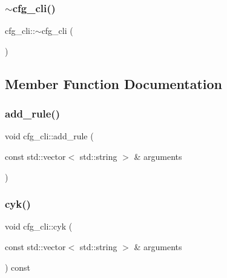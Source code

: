 \mbox{\label{classcfg__cli_ae6d900444e2cb5b820eea4db1a0c3723}} 
\subsubsection{\texorpdfstring{$\sim$cfg\_cli()}{~cfg\_cli()}}
{\footnotesize\ttfamily cfg\+\_\+cli\+::$\sim$cfg\+\_\+cli (\begin{DoxyParamCaption}{ }\end{DoxyParamCaption})}



\subsection{Member Function Documentation}
\mbox{\label{classcfg__cli_a9b6c74a0ff4a8d1d8c5b8b7c898da5b8}} 
\subsubsection{\texorpdfstring{add\_rule()}{add\_rule()}}
{\footnotesize\ttfamily void cfg\+\_\+cli\+::add\+\_\+rule (\begin{DoxyParamCaption}\item[{const std\+::vector$<$ std\+::string $>$ \&}]{arguments }\end{DoxyParamCaption})}

\mbox{\label{classcfg__cli_a67a7343e67e89eec5851c0b6a3224b36}} 
\subsubsection{\texorpdfstring{cyk()}{cyk()}}
{\footnotesize\ttfamily void cfg\+\_\+cli\+::cyk (\begin{DoxyParamCaption}\item[{const std\+::vector$<$ std\+::string $>$ \&}]{arguments }\end{DoxyParamCaption}) const}

\mbox{\label{classcfg__cli_a53b16d52eeb8cf55d0fd3e46e948b2ea}} 
